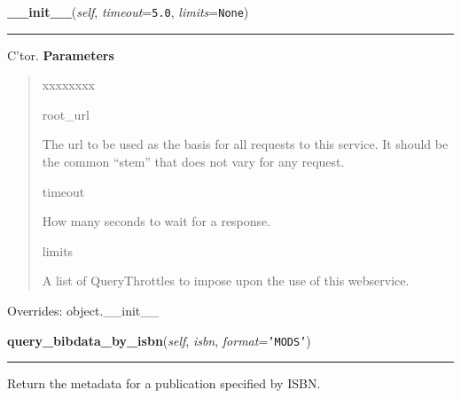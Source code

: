 \hspace{.8\funcindent}\begin{boxedminipage}{\funcwidth}

    \raggedright \textbf{\_\_init\_\_}(\textit{self}, \textit{timeout}={\tt 5.0}, \textit{limits}={\tt None})

    \vspace{-1.5ex}

    \rule{\textwidth}{0.5\fboxrule}
\setlength{\parskip}{2ex}

C'tor.
\setlength{\parskip}{1ex}
      \textbf{Parameters}
      \vspace{-1ex}

      \begin{quote}
        \begin{Ventry}{xxxxxxxx}

          \item[root\_url]


The url to be used as the basis for all requests to this service.
It should be the common ``stem'' that does not vary for any request.
          \item[timeout]


How many seconds to wait for a response.
          \item[limits]


A list of QueryThrottles to impose upon the use of this webservice.
        \end{Ventry}

      \end{quote}

      Overrides: object.\_\_init\_\_

    \end{boxedminipage}

    \label{biblio:webquery:loc:LocQuery:query_bibdata_by_isbn}

    \vspace{0.5ex}

\hspace{.8\funcindent}\begin{boxedminipage}{\funcwidth}

    \raggedright \textbf{query\_bibdata\_by\_isbn}(\textit{self}, \textit{isbn}, \textit{format}={\tt \texttt{'}\texttt{MODS}\texttt{'}})

    \vspace{-1.5ex}

    \rule{\textwidth}{0.5\fboxrule}
\setlength{\parskip}{2ex}

Return the metadata for a publication specified by ISBN.
\setlength{\parskip}{1ex}
    \end{boxedminipage}


